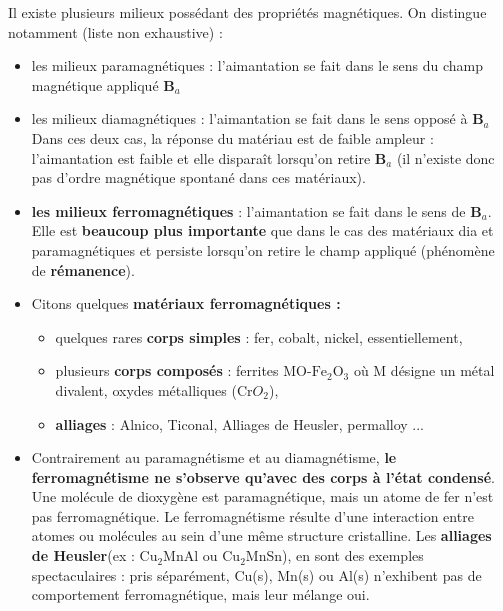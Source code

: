 \documentclass[11pt,a4paper]{report}
\begin{document}
Il existe plusieurs milieux possédant des propriétés magnétiques. On distingue notamment (liste non exhaustive) :
\begin{itemize}
	\item les milieux paramagnétiques : l'aimantation se fait dans le sens du champ magnétique 
	appliqué $\boldsymbol{B}_a$
	\item les milieux diamagnétiques : l'aimantation se fait dans le sens opposé à $\boldsymbol{B}_a$\\
	Dans ces deux cas, la réponse du matériau est de faible ampleur : l'aimantation est faible et 
	elle disparaît lorsqu'on retire $\boldsymbol{B}_a$ (il n'existe donc pas d'ordre magnétique 			spontané dans ces matériaux). 
	\item \textbf{les milieux ferromagnétiques} : l'aimantation se fait dans le sens
	de $\boldsymbol{B}_a$. Elle est \textbf{beaucoup plus importante} que dans le cas des matériaux 
	dia et paramagnétiques et persiste lorsqu'on retire le champ appliqué (phénomène de 					\textbf{rémanence}).\\
	
	\item Citons quelques \textbf{matériaux ferromagnétiques :}
	\begin{itemize}
		\item quelques rares \textbf{corps simples} : fer, cobalt, nickel, essentiellement,
		\item plusieurs \textbf{corps composés} : ferrites MO-$\text{Fe}_2\text{O}_3$ où 
			M désigne un métal divalent, oxydes métalliques (Cr$O_2$),
		\item \textbf{alliages} : Alnico, Ticonal, Alliages de Heusler, permalloy ...\\
	\end{itemize}
	
	\item Contrairement au paramagnétisme et au diamagnétisme, \textbf{le ferromagnétisme ne 				s'observe qu'avec des corps à l'état condensé}. Une molécule de dioxygène est paramagnétique, 			mais un atome de fer n'est pas ferromagnétique. Le ferromagnétisme résulte d'une interaction 			entre atomes ou molécules au sein d'une même structure cristalline. Les \textbf{alliages de 			Heusler}(ex : Cu$_2$MnAl ou Cu$_2$MnSn), en sont des exemples spectaculaires : pris séparément, 		Cu(s), Mn(s) ou Al(s) n'exhibent pas de comportement ferromagnétique, mais leur mélange oui.\\	
\end{itemize}
	
\end{document}
